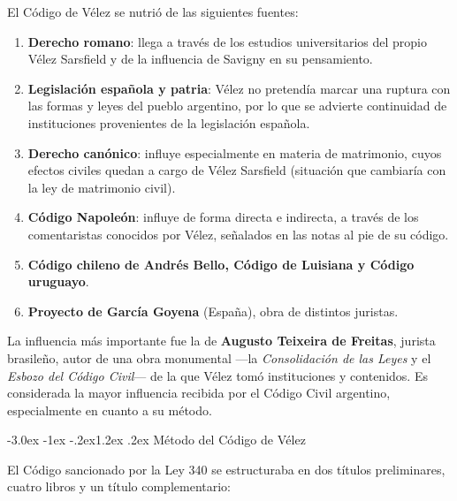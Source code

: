 \documentclass[12pt,oneside]{book}
\makeatletter
\renewcommand\section{\@startsection{section}{1}{\z@}%
  {-3.0ex \@plus -1ex \@minus -.2ex}{1.2ex \@plus .2ex}%
  {\normalfont\large\bfseries\color{acento}}}
\makeatother
\begin{document}
El Código de Vélez se nutrió de las siguientes fuentes:

\begin{enumerate}[label=\alph*)]
\item \textbf{Derecho romano}: llega a través de los estudios universitarios del propio Vélez Sarsfield y de la influencia de Savigny en su pensamiento.
\item \textbf{Legislación española y patria}: Vélez no pretendía marcar una ruptura con las formas y leyes del pueblo argentino, por lo que se advierte continuidad de instituciones provenientes de la legislación española.
\item \textbf{Derecho canónico}: influye especialmente en materia de matrimonio, cuyos efectos civiles quedan a cargo de Vélez Sarsfield (situación que cambiaría con la ley de matrimonio civil).
\item \textbf{Código Napoleón}: influye de forma directa e indirecta, a través de los comentaristas conocidos por Vélez, señalados en las notas al pie de su código.
\item \textbf{Código chileno de Andrés Bello, Código de Luisiana y Código uruguayo}.
\item \textbf{Proyecto de García Goyena} (España), obra de distintos juristas.
\end{enumerate}

\begin{importante}
La influencia más importante fue la de \textbf{Augusto Teixeira de Freitas}, jurista brasileño, autor de una obra monumental ---la \textit{Consolidación de las Leyes} y el \textit{Esbozo del Código Civil}--- de la que Vélez tomó instituciones y contenidos. Es considerada la mayor influencia recibida por el Código Civil argentino, especialmente en cuanto a su método.
\end{importante}

\section{Método del Código de Vélez}

El Código sancionado por la Ley 340 se estructuraba en dos títulos preliminares, cuatro libros y un título complementario:
\end{document}
